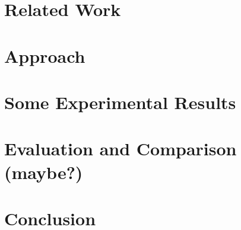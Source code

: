\documentclass[english]{llncs}
\begin{document}
\section{Related Work}
\label{section:relatedwork}


\section{Approach}
\label{section:approach}


\section{Some Experimental Results}
\label{section:results}


\section{Evaluation and Comparison (maybe?)}
\label{section:evaluation-comparison}


\section{Conclusion}
\label{section:conclusion}





\begin{acronym}[ICP]
\end{acronym}
\end{document}
